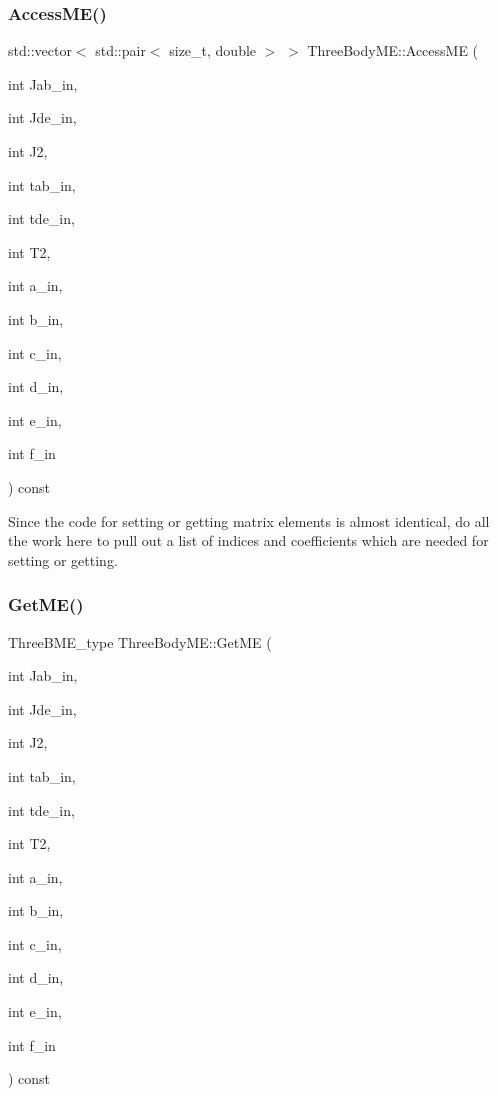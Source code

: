 \subsubsection{\texorpdfstring{Access\+M\+E()}{AccessME()}}
{\footnotesize\ttfamily std\+::vector$<$ std\+::pair$<$ size\+\_\+t, double $>$ $>$ Three\+Body\+M\+E\+::\+Access\+ME (\begin{DoxyParamCaption}\item[{int}]{Jab\+\_\+in,  }\item[{int}]{Jde\+\_\+in,  }\item[{int}]{J2,  }\item[{int}]{tab\+\_\+in,  }\item[{int}]{tde\+\_\+in,  }\item[{int}]{T2,  }\item[{int}]{a\+\_\+in,  }\item[{int}]{b\+\_\+in,  }\item[{int}]{c\+\_\+in,  }\item[{int}]{d\+\_\+in,  }\item[{int}]{e\+\_\+in,  }\item[{int}]{f\+\_\+in }\end{DoxyParamCaption}) const}

Since the code for setting or getting matrix elements is almost identical, do all the work here to pull out a list of indices and coefficients which are needed for setting or getting. \mbox{\label{classThreeBodyME_abd4f77aa9d0981c3ad1a61c2b2c54246}} 
\subsubsection{\texorpdfstring{Get\+M\+E()}{GetME()}}
{\footnotesize\ttfamily Three\+B\+M\+E\+\_\+type Three\+Body\+M\+E\+::\+Get\+ME (\begin{DoxyParamCaption}\item[{int}]{Jab\+\_\+in,  }\item[{int}]{Jde\+\_\+in,  }\item[{int}]{J2,  }\item[{int}]{tab\+\_\+in,  }\item[{int}]{tde\+\_\+in,  }\item[{int}]{T2,  }\item[{int}]{a\+\_\+in,  }\item[{int}]{b\+\_\+in,  }\item[{int}]{c\+\_\+in,  }\item[{int}]{d\+\_\+in,  }\item[{int}]{e\+\_\+in,  }\item[{int}]{f\+\_\+in }\end{DoxyParamCaption}) const}

